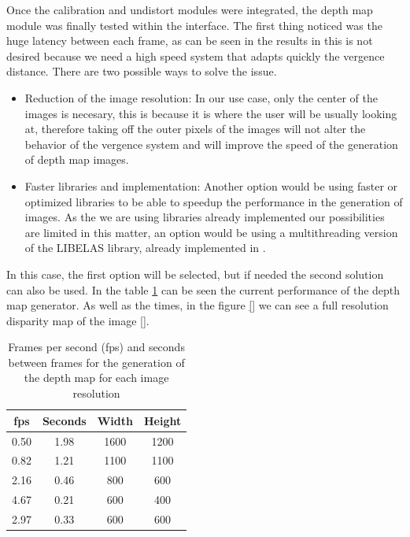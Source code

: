 \documentclass[10pt,a4paper,twocolumn,twoside]{article}
\begin{document}
	Once the calibration and undistort modules were integrated, the depth map module was finally tested within the interface. 
	The first thing noticed was the huge latency between each frame, as can be seen in the results in  this is not desired because we need a high speed system that adapts quickly the vergence distance. There are two possible ways to solve the issue.
	
	\begin{itemize}
		\item Reduction of the image resolution: In our use case, only the center of the images is necesary, this is because it is where the user will be usually looking at, therefore taking off the outer pixels of the images will not alter the behavior of the vergence system and will improve the speed of the generation of depth map images.
		
		\item Faster libraries and implementation: Another option would be using faster or optimized libraries to be able to speedup the performance in the generation of images. As the we are using libraries already implemented our possibilities are limited in this matter, an option would be using a multithreading version of the LIBELAS library, already implemented in \cite{web:LIBELAS}.
	\end{itemize}
	In this case, the first option will be selected, but if needed the second solution can also be used. In the table \ref{tab:depthmap} can be seen the current performance of the depth map generator. As well as the times, in the figure \ref{} we can see a full resolution disparity map of the image \ref{}.

	\begin{table}[t!]
		\begin{center}
			\begin{tabular}{cccc}
				\toprule
				fps & Seconds & Width & Height \\ 
				\midrule
				0.50 & 1.98 & 1600 & 1200 \\ 
		
				0.82 & 1.21 & 1100 & 1100 \\ 
		
				2.16 & 0.46 & 800 & 600 \\ 
		
				4.67 & 0.21 & 600 & 400 \\ 
		
				2.97 & 0.33 & 600 & 600 \\ 
				\bottomrule
				
			\end{tabular} 
			\caption{Frames per second (fps) and seconds between frames for the generation of the depth map for each image resolution }
			\label{tab:depthmap}
		\end{center}
	\end{table}
\end{document}
